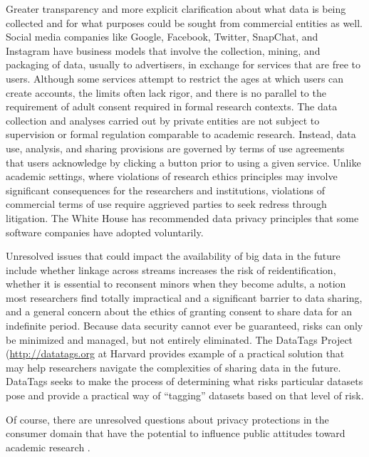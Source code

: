\documentclass[letterpaper,man,apacite,natbib]{apa6}
\begin{document}
Greater transparency and more explicit clarification about what data is being collected and for what purposes could be sought from commercial entities as well.
Social media companies like Google, Facebook, Twitter, SnapChat, and Instagram have business models that involve the collection, mining, and packaging of data, usually to advertisers, in exchange for services that are free to users.
Although some services attempt to restrict the ages at which users can create accounts, the limits often lack rigor, and there is no parallel to the requirement of adult consent required in formal research contexts.
The data collection and analyses carried out by private entities are not subject to supervision or formal regulation comparable to academic research.
Instead, data use, analysis, and sharing provisions are governed by terms of use agreements that users acknowledge by clicking a button prior to using a given service.
Unlike academic settings, where violations of research ethics principles may involve significant consequences for the researchers and institutions, violations of commercial terms of use require aggrieved parties to seek redress through litigation.
The White House has recommended data privacy principles \cite{data-privacy-networked-world} that some software companies have adopted voluntarily.

Unresolved issues that could impact the availability of big data in the future include whether linkage across streams increases the risk of reidentification, whether it is essential to reconsent minors when they become adults, a notion most researchers find totally impractical and a significant barrier to data sharing, and a general concern about the ethics of granting consent to share data for an indefinite period.
Because data security cannot ever be guaranteed, risks can only be minimized and managed, but not entirely eliminated.
The DataTags Project (\url{http://datatags.org} at Harvard provides example of a practical solution that may help researchers navigate the complexities of sharing data in the future. 
DataTags seeks to make the process of determining what risks particular datasets pose and provide a practical way of ``tagging'' datasets based on that level of risk.

Of course, there are unresolved questions about privacy protections in the consumer domain that have the potential to influence public attitudes toward academic research \cite{meyer_everything_2014}.
\end{document}
